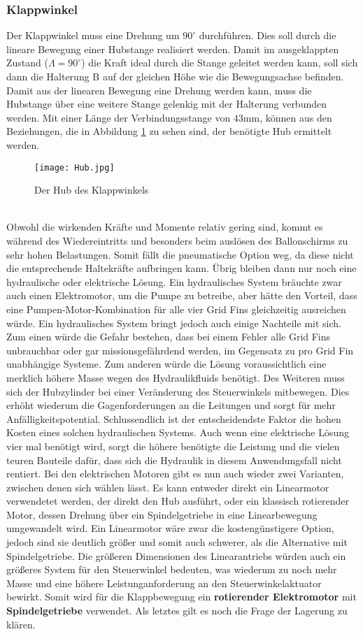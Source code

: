 \subsubsection{Klappwinkel}
Der Klappwinkel muss eine Drehung um $90^\circ$ durchführen. Dies soll durch die lineare Bewegung einer Hubstange realisiert werden. Damit im ausgeklappten Zustand ($\Lambda = 90^\circ$) die Kraft ideal durch die Stange geleitet werden kann, soll sich dann die Halterung B auf der gleichen Höhe wie die Bewegungsachse befinden. Damit aus der linearen Bewegung eine Drehung werden kann, muss die Hubstange über eine weitere Stange gelenkig mit der Halterung verbunden werden. Mit einer Länge der Verbindungsstange von $43$mm, können aus den Beziehungen, die in Abbildung \ref{abb_hub} zu sehen sind, der benötigte Hub ermittelt werden.
\begin{figure}[h]
	\centering
	\texttt{[image: Hub.jpg]}
	\caption{Der Hub des Klappwinkels}
	\label{abb_hub}
\end{figure}\\
Obwohl die wirkenden Kräfte und Momente relativ gering sind, kommt es während des Wiedereintritts und besonders beim auslösen des Ballonschirms zu sehr hohen Belastungen. Somit fällt die pneumatische Option weg, da diese nicht die entsprechende Haltekräfte aufbringen kann. Übrig bleiben dann nur noch eine hydraulische oder elektrische Lösung. Ein hydraulisches System bräuchte zwar auch einen Elektromotor, um die Pumpe zu betreibe, aber hätte den Vorteil, dass eine Pumpen-Motor-Kombination für alle vier Grid Fins gleichzeitig ausreichen würde. Ein hydraulisches System bringt jedoch auch einige Nachteile mit sich. Zum einen würde die Gefahr bestehen, dass bei einem Fehler alle Grid Fins unbrauchbar oder gar missionsgefährdend werden, im Gegensatz zu pro Grid Fin unabhängige Systeme. Zum anderen würde die Lösung voraussichtlich eine merklich höhere Masse wegen des Hydraulikfluids benötigt. Des Weiteren muss sich der Hubzylinder bei einer Veränderung des Steuerwinkels mitbewegen. Dies erhöht wiederum die Gagenforderungen an die Leitungen und sorgt für mehr Anfälligkeitspotential. Schlussendlich ist der entscheidendste Faktor die hohen Kosten eines solchen hydraulischen Systems. Auch wenn eine elektrische Lösung vier mal benötigt wird, sorgt die höhere benötigte die Leistung und die vielen teuren Bauteile dafür, dass sich die Hydraulik in diesem Anwendungsfall nicht rentiert. Bei den elektrischen Motoren gibt es nun auch wieder zwei Varianten, zwischen denen sich wählen lässt. Es kann entweder direkt ein Linearmotor verwendetet werden, der direkt den Hub ausführt, oder ein klassisch rotierender Motor, dessen Drehung über ein Spindelgetriebe in eine Linearbewegung umgewandelt wird. Ein Linearmotor wäre zwar die kostengünstigere Option, jedoch sind sie deutlich größer und somit auch schwerer, als die Alternative mit Spindelgetriebe. Die größeren Dimensionen des Linearantriebs würden auch ein größeres System für den Steuerwinkel bedeuten, was wiederum zu noch mehr Masse und eine höhere Leistunganforderung an den Steuerwinkelaktuator bewirkt.
Somit wird für die Klappbewegung ein \textbf{rotierender Elektromotor} mit \textbf{Spindelgetriebe} verwendet. Als letztes gilt es noch die Frage der Lagerung zu klären.

